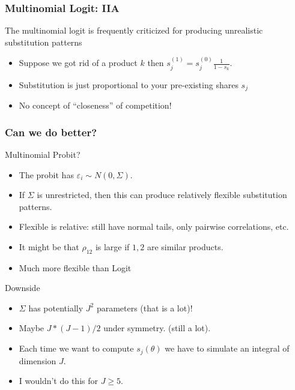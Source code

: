 \documentclass[xcolor=pdftex,dvipsnames,table,mathserif]{beamer}
\begin{document}
\begin{frame}
\frametitle{Multinomial Logit: IIA}
The multinomial logit is frequently criticized for producing unrealistic substitution patterns
\begin{itemize}
\item Suppose we got rid of a product $k$ then $s_j^{(1)} = s_j^{(0)} \frac{1}{1- s_k}$.
\item Substitution is just proportional to your pre-existing shares $s_j$
\item No concept of ``closeness'' of competition!
\end{itemize}
\end{frame}

\begin{frame}
\frametitle{Can we do better?}
Multinomial Probit?
\begin{itemize}
\item The probit has $\varepsilon_i \sim N(0,\Sigma)$.
\item If $\Sigma$ is unrestricted, then this can produce relatively flexible substitution patterns.
\item Flexible is relative: still have normal tails, only pairwise correlations, etc.
\item It might be that $\rho_{12}$ is large if $1,2$ are similar products.
\item Much more flexible than Logit
\end{itemize}
Downside
\begin{itemize}
\item $\Sigma$ has potentially $J^2$ parameters (that is a lot)!
\item Maybe $J * (J-1)/2$ under symmetry. (still a lot).
\item Each time we want to compute $s_j(\theta)$ we have to simulate an integral of dimension $J$.
\item I wouldn't do this for $J \geq 5$.
\end{itemize}
\end{frame}
\end{document}
